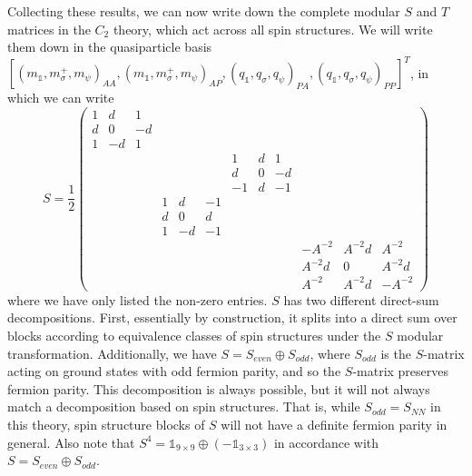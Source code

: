 \documentclass[12pt,a4paper]{article}
\newcommand{\unit}{\mathds{1}}
\newcommand\be            {\begin{equation}}
\newcommand\ee            {\end{equation}}
\begin{document}
\medskip

Collecting these results, we can now write down the complete modular $S$ and $T$ matrices in the $C_2$ theory, which act across all spin structures. 
We will write them down in the quasiparticle basis $[(m_\unit,m_\sigma^+,m_\psi)_{AA},(m_\unit,m_\sigma^+,m_\psi)_{AP},(q_\unit,q_\sigma,q_\psi)_{PA},(q_\unit,q_\sigma,q_\psi)_{PP}]^T$, in which we can write
\be \label{modularS}
S = \frac{1}{2}\begin{pmatrix} 1 & d & 1 &			&&&			&&&			&& \\ 
					      d & 0 &-d &			&&&			&&&			&&\\
					      1&-d&1 & 			&&&			&&&			&&\\
						&&&				&&&			1&d&1&		&& \\
						&&&				&&&			d&0&-d&		&&\\
						&&&				&&&			-1&d&-1&		&&\\
						&&&				1&d&-1&		&&&			&&\\
						&&&				d&0&d&		&&&			&&\\
						&&&				1&-d&-1&		&&&			&&\\
						&&&				&&&			&&&			-A^{-2} & A^{-2}d & A^{-2}\\
						&&&				&&&			&&&			A^{-2}d & 0 & A^{-2}d \\ 
						&&&				&&&			&&&			A^{-2} & A^{-2}d & -A^{-2} \end{pmatrix}\ee		
where we have only listed the non-zero entries. 
$S$ has two different direct-sum decompositions. First, essentially by construction, it splits into a direct sum over blocks according to equivalence classes of spin structures under the $S$ modular transformation. 
Additionally, we have $S = S_{even} \oplus S_{odd}$, where $S_{odd}$ is the $S$-matrix acting on ground states with odd fermion parity, and so the $S$-matrix preserves fermion parity.
This decomposition is always possible, but it will not always match a decomposition based on spin structures. 
That is, while $S_{odd} = S_{NN}$ in this theory, spin structure blocks of $S$ will not have a definite fermion parity in general. 
Also note that $S^4 = \unit_{9\times9}\oplus(-\unit_{3\times3})$ in accordance with $S = S_{even} \oplus S_{odd}$. 
\end{document}

